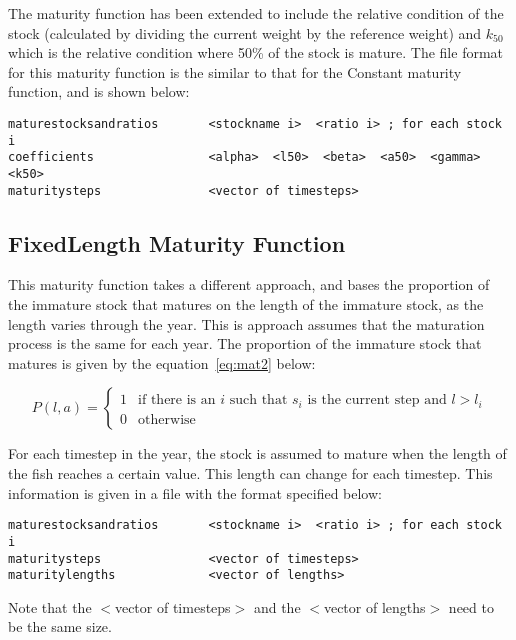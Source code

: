 \documentclass[10pt,twoside]{book}
\begin{document}
The maturity function has been extended to include the relative condition of the stock (calculated by dividing the current weight by the reference weight) and $k_{50}$ which is the relative condition where 50\% of the stock is mature.  The file format for this maturity function is the similar to that for the Constant maturity function, and is shown below:

{\small\begin{verbatim}
maturestocksandratios       <stockname i>  <ratio i> ; for each stock i
coefficients                <alpha>  <l50>  <beta>  <a50>  <gamma>  <k50>
maturitysteps               <vector of timesteps>
\end{verbatim}}

\subsection{FixedLength Maturity Function}
This maturity function takes a different approach, and bases the proportion of the immature stock that matures on the length of the immature stock, as the length varies through the year.  This is approach assumes that the maturation process is the same for each year.  The proportion of the immature stock that matures is given by the equation~\ref{eq:mat2} below:

\begin{equation}\label{eq:mat2}
P(l, a) =
\begin{cases}
1 & \textrm{if there is an $i$ such that $s_i$ is the current step and $l > l_i$} \\
0 & \textrm{otherwise}
\end{cases}
\end{equation}

For each timestep in the year, the stock is assumed to mature when the length of the fish reaches a certain value.  This length can change for each timestep.  This information is given in a file with the format specified below:

{\small\begin{verbatim}
maturestocksandratios       <stockname i>  <ratio i> ; for each stock i
maturitysteps               <vector of timesteps>
maturitylengths             <vector of lengths>
\end{verbatim}}

Note that the $<$vector of timesteps$>$ and the $<$vector of lengths$>$ need to be the same size.
\end{document}
